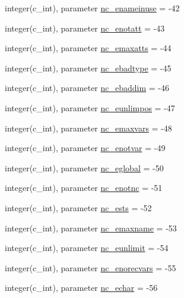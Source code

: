 \begin{DoxyCompactItemize}
\item 
integer(c\+\_\+int), parameter \hyperlink{namespacenetcdf__nc__data_a07f351a61b65f52e5bb67d3bc15f87d6}{nc\+\_\+enameinuse} = -\/42
\item 
integer(c\+\_\+int), parameter \hyperlink{namespacenetcdf__nc__data_adedcd537ac75b8f3ea97ee278f7a61f9}{nc\+\_\+enotatt} = -\/43
\item 
integer(c\+\_\+int), parameter \hyperlink{namespacenetcdf__nc__data_aa455239c6123d7b9db4fd6e67da4d46e}{nc\+\_\+emaxatts} = -\/44
\item 
integer(c\+\_\+int), parameter \hyperlink{namespacenetcdf__nc__data_a5f5ae403076d792021fd714a24bc2e7b}{nc\+\_\+ebadtype} = -\/45
\item 
integer(c\+\_\+int), parameter \hyperlink{namespacenetcdf__nc__data_aed9c733c3cdb4e6cd5544fbc240739df}{nc\+\_\+ebaddim} = -\/46
\item 
integer(c\+\_\+int), parameter \hyperlink{namespacenetcdf__nc__data_a62be59604a485bc9d1259a8a94a9e501}{nc\+\_\+eunlimpos} = -\/47
\item 
integer(c\+\_\+int), parameter \hyperlink{namespacenetcdf__nc__data_a21a339b9ce80e3705aedc309fcb6be3c}{nc\+\_\+emaxvars} = -\/48
\item 
integer(c\+\_\+int), parameter \hyperlink{namespacenetcdf__nc__data_ae87507dd9130d6f4ef66daa3626cc6c8}{nc\+\_\+enotvar} = -\/49
\item 
integer(c\+\_\+int), parameter \hyperlink{namespacenetcdf__nc__data_a4bf9349dddd9a80ce363bb89be890f29}{nc\+\_\+eglobal} = -\/50
\item 
integer(c\+\_\+int), parameter \hyperlink{namespacenetcdf__nc__data_a54890d95abf2cb564d7294f2f7e04af6}{nc\+\_\+enotnc} = -\/51
\item 
integer(c\+\_\+int), parameter \hyperlink{namespacenetcdf__nc__data_a1d5fe03e609c4e9a402517518099f92e}{nc\+\_\+ests} = -\/52
\item 
integer(c\+\_\+int), parameter \hyperlink{namespacenetcdf__nc__data_aed1b24db9fb95b548b1b2c88d05cc036}{nc\+\_\+emaxname} = -\/53
\item 
integer(c\+\_\+int), parameter \hyperlink{namespacenetcdf__nc__data_a97e13a4f19397a41377c919316b1f75f}{nc\+\_\+eunlimit} = -\/54
\item 
integer(c\+\_\+int), parameter \hyperlink{namespacenetcdf__nc__data_ac9cf156c3357804270d95bef39921992}{nc\+\_\+enorecvars} = -\/55
\item 
integer(c\+\_\+int), parameter \hyperlink{namespacenetcdf__nc__data_a8b67da1d7539ef650246387c0a914653}{nc\+\_\+echar} = -\/56

\end{DoxyCompactItemize}

